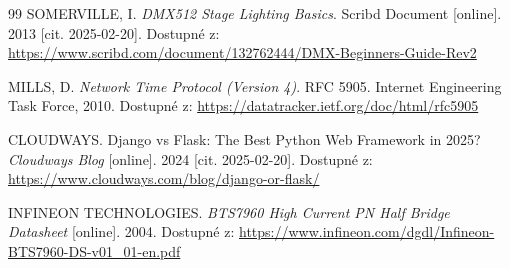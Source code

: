\begin{thebibliography}{99}
    SOMERVILLE, I. \textit{DMX512 Stage Lighting Basics}. 
    Scribd Document [online]. 2013 [cit. 2025-02-20]. 
    Dostupné z: \url{https://www.scribd.com/document/132762444/DMX-Beginners-Guide-Rev2}

    MILLS, D. \textit{Network Time Protocol (Version 4)}. 
    RFC 5905. Internet Engineering Task Force, 2010. 
    Dostupné z: \url{https://datatracker.ietf.org/doc/html/rfc5905}

    CLOUDWAYS. Django vs Flask: The Best Python Web Framework in 2025? 
    \textit{Cloudways Blog} [online]. 2024 [cit. 2025-02-20]. 
    Dostupné z: \url{https://www.cloudways.com/blog/django-or-flask/}

    INFINEON TECHNOLOGIES. \textit{BTS7960 High Current PN Half Bridge Datasheet} [online]. 
    2004. Dostupné z: \url{https://www.infineon.com/dgdl/Infineon-BTS7960-DS-v01_01-en.pdf}

\end{thebibliography}